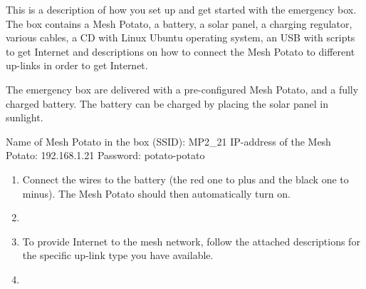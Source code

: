 This is a description of how you set up and get started with the emergency box. The box contains a Mesh Potato, a battery, a solar panel, a charging regulator, various cables, a CD with Linux Ubuntu operating system, an USB with scripts to get Internet and descriptions on how to connect the Mesh Potato to different up-links in order to get Internet. 

The emergency box are delivered with a pre-configured Mesh Potato, and a fully charged battery. The battery can be charged by placing the solar panel in sunlight. 

Name of Mesh Potato in the box (SSID): MP2_21
IP-address of the Mesh Potato: 192.168.1.21
Password: potato-potato

\begin{enumerate}
\item Connect the wires to the battery (the red one to plus and the black one to minus). The Mesh Potato should then automatically turn on. 
\item 
\item To provide Internet to the mesh network, follow the attached descriptions for the specific up-link type you have available. 
\item
\end{enumerate} 